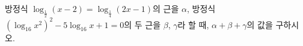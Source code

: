 방정식 $\log_{\frac{1}{2}} (x-2)=\log_{\frac{1}{4}} (2x-1)$의 근을 $\alpha$, 방정식 $(\log_{16} x^2)^2-5\log_{16} x+1=0$의 두 근을 $\beta$, $\gamma$라 할 때, $\alpha+\beta+\gamma$의 값을 구하시오.
